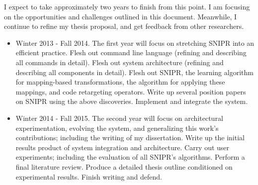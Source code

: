 I expect to take approximately two years to finish from this point. I am 
focusing on the opportunities and challenges outlined in this document. 
Meanwhile, I continue to refine my thesis proposal, and get feedback from other 
researchers. 

\begin{itemize}
\item Winter 2013 - Fall 2014. The first year will focus on stretching 
    \uppercase{SnipR} into an efficient practice.
    \subitem Flesh out command line language (refining and describing all 
    commands in detail).
    \subitem Flesh out system architecture (refining and describing all 
    components in detail).
    \subitem Flesh out \uppercase{SnipR}, the learning algorithm for mapping-based transformations,  
	 the algorithm for applying these mappings, and code retargeting operators.  
    \subitem Write up several position papers on \uppercase{SnipR} using the above discoveries.
    \subitem Implement and integrate the system.
\item Winter 2014 - Fall 2015. The second year will focus on architectural 
    experimentation, evolving the system, and generalizing this work's 
    contributions; including the writing of my dissertation.
    \subitem Write up the initial results product of system integration and 
    architecture.
    \subitem Carry out user experiments; including the evaluation of all \uppercase{SnipR}'s algorithms.
    \subitem Perform a final literature review. 
    \subitem Produce a detailed thesis outline conditioned on experimental 
    results.
    \subitem Finish writing and defend.
\end{itemize}
